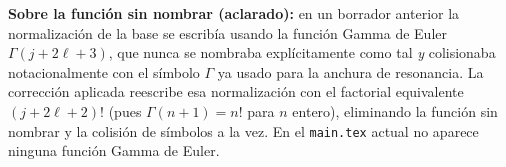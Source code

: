 \documentclass[11pt]{article}
\begin{document}
\vspace{1em}
\noindent\textbf{Sobre la funci\'on sin nombrar (aclarado):} en un borrador
anterior la normalizaci\'on de la base se escrib\'ia usando la funci\'on
Gamma de Euler $\Gamma(j+2\ell+3)$, que nunca se nombraba expl\'icitamente
como tal \emph{y} colisionaba notacionalmente con el s\'imbolo $\Gamma$ ya
usado para la anchura de resonancia. La correcci\'on aplicada reescribe esa
normalizaci\'on con el factorial equivalente $(j+2\ell+2)!$
(pues $\Gamma(n{+}1)=n!$ para $n$ entero), eliminando la funci\'on sin
nombrar y la colisi\'on de s\'imbolos a la vez. En el \texttt{main.tex}
actual no aparece ninguna funci\'on Gamma de Euler.
\end{document}
